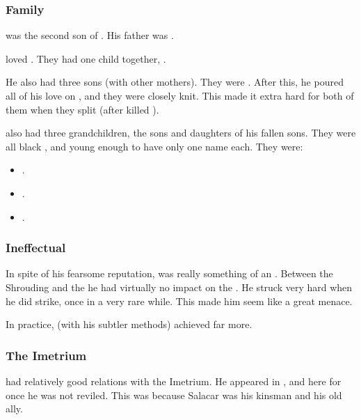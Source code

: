 \subsubsection{Family}
\Ishnaruchaefir was the second son of \TyarithXserasshana.
His father was . 

\Ishnaruchaefir{} loved \Triestessakhin. 
They had one child together, \Nzessuacrith. 

He also had three sons (with other mothers). 
They were . 
After this, he poured all of his love on \Nzessuacrith, and they were closely knit. 
This made it extra hard for both of them when they split (after \Ishnaruchaefir{} killed \Triestessakhin). 

\Ishnaruchaefir{} also had three grandchildren, the sons and daughters of his fallen sons. 
They were all black \dragons, and young enough to have only one name each. 
They were: 
\begin{itemize}
  \item {}. 
  \item {}. 
  \item {}. 
\end{itemize}





\subsubsection{Ineffectual}
In spite of his fearsome reputation, \Ishnaruchaefir was really something of an . 
Between the Shrouding and the \thirdbanewar he had virtually no impact on the \feud. 
He struck very hard when he did strike, once in a very rare while.
This made him seem like a great menace. 

In practice, \Secherdamon (with his subtler methods) achieved far more. 





\subsubsection{The Imetrium}
\Ishnaruchaefir had relatively good relations with the Imetrium. 
He appeared in , and here for once he was not reviled. 
This was because Salacar was his kinsman and his old ally. 





